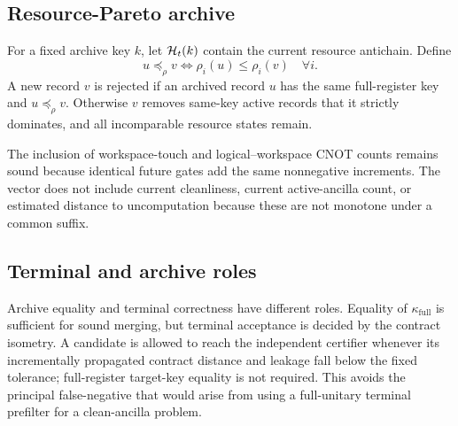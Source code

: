 \subsection{Resource-Pareto archive}

For a fixed archive key $k$, let $\mathcal{H}_t(k)$ contain the current resource antichain. Define
\begin{equation}
u\preceq_\rho v
\iff \rho_i(u)\leq\rho_i(v)\quad\forall i.
\end{equation}
A new record $v$ is rejected if an archived record $u$ has the same full-register key and $u\preceq_\rho v$. Otherwise $v$ removes same-key active records that it strictly dominates, and all incomparable resource states remain.

The inclusion of workspace-touch and logical--workspace CNOT counts remains sound because identical future gates add the same nonnegative increments. The vector does not include current cleanliness, current active-ancilla count, or estimated distance to uncomputation because these are not monotone under a common suffix.

\subsection{Terminal and archive roles}

Archive equality and terminal correctness have different roles. Equality of $\kappa_{\mathrm{full}}$ is sufficient for sound merging, but terminal acceptance is decided by the contract isometry. A candidate is allowed to reach the independent certifier whenever its incrementally propagated contract distance and leakage fall below the fixed tolerance; full-register target-key equality is not required. This avoids the principal false-negative that would arise from using a full-unitary terminal prefilter for a clean-ancilla problem.
